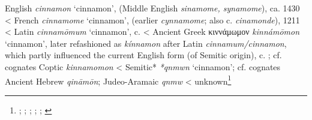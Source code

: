 \begin{etymology}\label{ety:cinnamon}
English \textit{cinnamon} `cinnamon', (Middle English \textit{sinamome, synamome}), ca. 1430
< French \textit{cinnamome} `cinnamon', (earlier \textit{cynnamome}; also  c. \textit{cinamonde}), 1211
< Latin \textit{cinnamōmum} `cinnamon',  c. \AD{}
< Ancient Greek {κιννάμωμον} \textit{kinnámōmon} `cinnamon', later refashioned as \textit{kínnamon} after Latin \textit{cinnamum/cinnamon}, which partly influenced the current English form (of Semitic origin),  c. \BC{}; cf. cognates Coptic  \textit{kinnamomon}
< Semitic* \textit{*qnmwn} `cinnamon'; cf. cognates Ancient Hebrew  \textit{qināmōn}; Judeo-Aramaic  \textit{qnmw}
< unknown\footnote{\textcite[cinnamon]{oed}; \textcite{tlfi}; \textcite{lewis_latin_1879}; \textcite[701]{beekes_etymological_2010}; \textcite[585]{klein_comprehensive_1987}; \textcite{rosol_early_2018}}
\end{etymology}